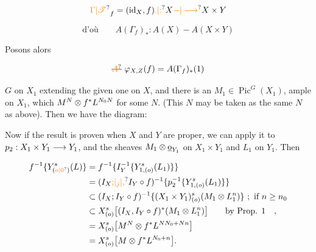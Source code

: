 \[
\unsure{\Gamma|\mathscr T}_f=(\mathrm{id}_X,f)\unsure{. |{:}}X\unsure{\mathbin{-}|\longrightarrow}X\times Y
\]

\[
\text{d'où}\qquad A(\Gamma_f)_*:A(X)\mathbin{-}A(X\times Y)
\]

Posons alors

\[
\deleted{\unsure{A}}\ \varphi_{X,Z}(f)=A(\Gamma_f)_*(1)
\]


$G$ on $X_1$ extending the given one on $X$, and there is an $M_1\in\operatorname{Pic}^{G}(X_1)$, ample on $X_1$, which  $M^N\otimes f^*L^{N_0N}$ for some $N$. (This $N$ may be taken as the same $N$ as above). Then we have the diagram:


Now if the result is proven when $X$ and $Y$ are proper, we can apply it to $p_2:X_1\times Y_1\longrightarrow Y_1$, and the sheaves $M_1\otimes\underline{\mathrm{o}}_{Y_1}$ on $X_1\times Y_1$ and $L_1$ on $Y_1$. Then

\[
\begin{aligned}
f^{-1}\handwritten{\{}Y^s_{(\unsure{o|0})}(L)\handwritten{\}}&=f^{-1}\handwritten{\{}I_Y^{-1}\handwritten{\{}Y^s_{1,(o)}(L_1)\handwritten{\}}\handwritten{\}}\\
&=(I_X\unsure{{;}|{}_{j}|{,}}I_Y\circ f)^{-1}\handwritten{\{}p_2^{-1}\handwritten{\{}Y^s_{1,(o)}(L_1)\handwritten{\}}\handwritten{\}}\\
&\handwritten{\subset}(I_X\mathpunct{;}I_Y\circ f)^{-1}\handwritten{\{}(X_1\times Y_1)^s_{(o)}(M_1\handwritten{\otimes}L_1^n)\handwritten{\}}\ ;\ \text{if }n\geq n_0\\
&\handwritten{\subset}X^s_{(o)}\handwritten{\bigl[}(I_X,I_Y\circ f)^*(M_1\handwritten{\otimes}L_1^n)\handwritten{\bigr]}\qquad\text{by Prop. 1}\quad,\\
&=X^s_{(o)}\handwritten{\bigl[}M^N\handwritten{\otimes} f^*L^{NN_0+Nn}\handwritten{\bigr]}\\
&=X^s_{(o)}\handwritten{\bigl[}M\handwritten{\otimes} f^*L^{N_0+n}\handwritten{\bigr]}.
\end{aligned}
\]

